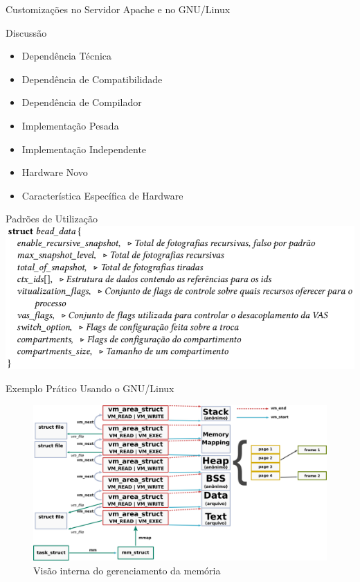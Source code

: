 \documentclass[xcolor={usenames,svgnames,dvipsnames},brazil,english,12pt,aspectratio=149]{beamer}
\begin{document}
\begin{frame}{Customizações no Servidor Apache e no GNU/Linux}
  
\end{frame}

\begin{frame}{Discussão}
  \begin{itemize}
    \item Dependência Técnica
    \item Dependência de Compatibilidade
    \item Dependência de Compilador
    \item Implementação Pesada
    \item Implementação Independente
    \item Hardware Novo
    \item Característica Específica de Hardware
  \end{itemize}
\end{frame}

\begin{frame}{Padrões de Utilização}
  \centering
  \includegraphics[width=\textwidth]{beadData}
\end{frame}

\begin{frame}{Exemplo Prático Usando o GNU/Linux}
  \begin{figure}[!h]
    \centering
    \includegraphics[width=.9\textwidth]{kernel_manages_memory}
    \caption*{Visão interna do gerenciamento da memória}
  \end{figure}
\end{frame}
\end{document}
